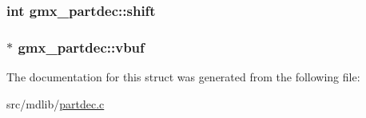 \hypertarget{structgmx__partdec_a0b94a55d9edbfd4af09c9ee8b1e2f30f}{
\subsubsection[{shift}]{\setlength{\rightskip}{0pt plus 5cm}int {\bf gmx\-\_\-partdec\-::shift}}}\label{structgmx__partdec_a0b94a55d9edbfd4af09c9ee8b1e2f30f}
\hypertarget{structgmx__partdec_a4236041be0410ec851935b6b0df5724d}{
\subsubsection[{vbuf}]{$\ast$ {\bf gmx\-\_\-partdec\-::vbuf}}}\label{structgmx__partdec_a4236041be0410ec851935b6b0df5724d}


\-The documentation for this struct was generated from the following file\-:\begin{DoxyCompactItemize}
\item 
src/mdlib/\hyperlink{partdec_8c}{partdec.\-c}\end{DoxyCompactItemize}
